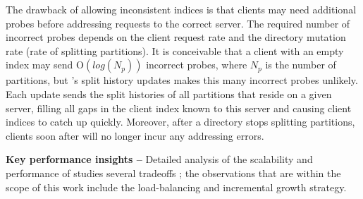 The drawback of allowing inconsistent indices is that clients may need 
additional probes before addressing requests to the correct server.
The required number of incorrect probes depends on the client request 
rate and the directory mutation rate (rate of splitting partitions).
It is conceivable that a client with an empty index may send O$(log(N_p))$ 
incorrect probes, where $N_p$ is the 
number of partitions, but \giga{}'s split history updates makes this many
incorrect probes unlikely.
Each update sends the split histories of all partitions that reside on a
given server, filling all gaps in the client index known to this server and
causing client indices to catch up quickly.
Moreover, after a directory stops splitting partitions, clients soon after will 
no longer incur any addressing errors.

\textbf{Key performance insights -- }
Detailed analysis of the scalability and performance of \giga{} studies several
tradeoffs \citep{giga}; the observations that are within the scope of this work
include the load-balancing and incremental growth strategy.


